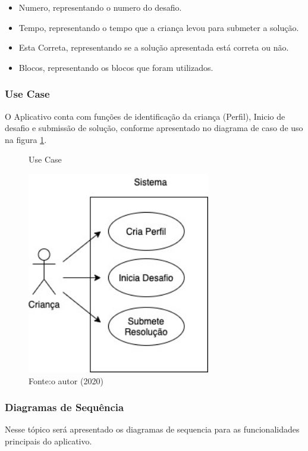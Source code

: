         \begin{itemize}
            \item Numero, representando o numero do desafio.
            \item Tempo, representando o tempo que a criança levou para submeter a solução.
            \item Esta Correta, representando se a solução apresentada está correta ou não.
            \item Blocos, representando os blocos que foram utilizados.
        \end{itemize} 
        
        \subsubsection{Use Case}
        O Aplicativo conta com funções de identificação da criança (Perfil), Inicio de desafio e submissão de solução, conforme apresentado no diagrama de caso de uso na figura \ref{figura:use_case}.
        
        \begin{figure}[h!]
            \centering
            \caption{Use Case}
            \includegraphics[width=8cm]{images/cap3/Use Case.jpg}
            \caption*{Fonte:o autor (2020)}
            \label{figura:use_case}
        \end{figure}
        
        \subsubsection{Diagramas de Sequência}
        
        Nesse tópico será apresentado os diagramas de sequencia para as funcionalidades principais do aplicativo.
        
